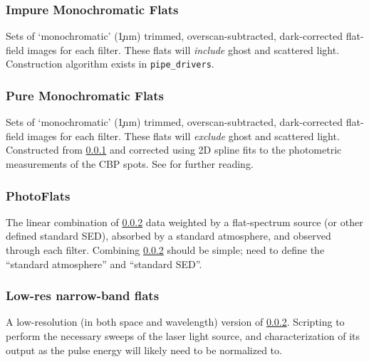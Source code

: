 \subsubsection{Impure Monochromatic Flats}\label{sec:CPP:output:monoFlat}
Sets of `monochromatic' (\c 1nm) trimmed, overscan-subtracted, dark-corrected flat-field images for each filter. These flats will \emph{include} ghost and scattered light.
\alg Construction algorithm exists in \texttt{pipe\_drivers}.


\subsubsection{Pure Monochromatic Flats}\label{sec:CPP:output:monoPhotoFlat}
Sets of `monochromatic' (\c 1nm) trimmed, overscan-subtracted, dark-corrected flat-field images for each filter. These flats will \emph{exclude} ghost and scattered light.
\alg Constructed from \secsymbol\ref{sec:CPP:output:monoFlat} and corrected using 2D spline fits to the photometric measurements of the CBP spots. See  for further reading.


\subsubsection{PhotoFlats}\label{sec:CPP:output:standardPhotoFlat}
The linear combination of \secsymbol\ref{sec:CPP:output:monoPhotoFlat} data weighted by a flat-spectrum source (or other defined standard SED), absorbed by a standard atmosphere, and observed through each filter.
\alg Combining \secsymbol\ref{sec:CPP:output:monoPhotoFlat} should be simple; need to define the ``standard atmosphere'' and ``standard SED''.


\subsubsection{Low-res narrow-band flats}\label{sec:CPP:output:monoPhotoFlatLowRes}
A low-resolution (in both space and wavelength) version of \secsymbol\ref{sec:CPP:output:monoPhotoFlat}.
\alg Scripting to perform the necessary sweeps of the laser light source, and characterization of its output as the pulse energy will likely need to be normalized to.	


